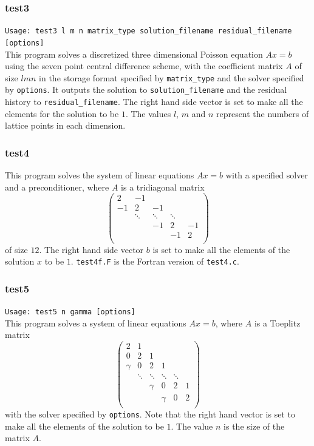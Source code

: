 \documentclass[a4paper]{article}
\begin{document}
\subsubsection{test3}

\verb+Usage: test3 l m n matrix_type solution_filename residual_filename [options]+\\

This program solves a discretized three dimensional 
Poisson equation $Ax = b$ using the seven
point central difference scheme, with the coefficient matrix $A$ 
of size $lmn$ in the storage format specified
by \verb|matrix_type| and the solver specified by {\tt options}. 
It outputs the solution to {\tt solution\_filename} and 
the residual history to {\tt residual\_filename}. 
The right hand side vector is set to make all the elements for the solution to be $1$. 
The values $l$, $m$ and $n$ represent the numbers of lattice
points in each dimension. 

\subsubsection{test4}
This program solves the system of linear equations $Ax = b$ with a specified 
solver and a preconditioner, where $A$ is a tridiagonal matrix
\[
\left(
\begin{array}{ccccc}
2 & -1 &   &  &   \\
-1 & 2 & -1 &  &   \\
  & \ddots  & \ddots  & \ddots  &   \\
  &   & -1 & 2 & -1 \\
  &   &   & -1 & 2 \\
\end{array}
\right)
\]
of size $12$.
The right hand side vector $b$ is set to make 
all the elements of the solution $x$ to be $1$. 
{\tt test4f.F} is the Fortran version of {\tt test4.c}.

\subsubsection{test5}

\verb+Usage: test5 n gamma [options]+\\

This program solves a system of linear equations $Ax =b$, where $A$ is a Toeplitz matrix
\[
\left(
\begin{array}{cccccc}
2 & 1 &   &  &  & \\
0 & 2 & 1 &  &  & \\
\gamma & 0& 2 & 1 &  & \\
 & \ddots & \ddots & \ddots & \ddots & \\
 &  &   \gamma &0 &       2   & 1 \\
 &  &  &   \gamma & 0& 2 \\
\end{array}
\right)
\]
with the solver specified by {\tt options}. 
Note that the right hand vector is set to make all the elements 
of the solution to be $1$. 
The value $n$ is the size of the matrix $A$.
\end{document}
